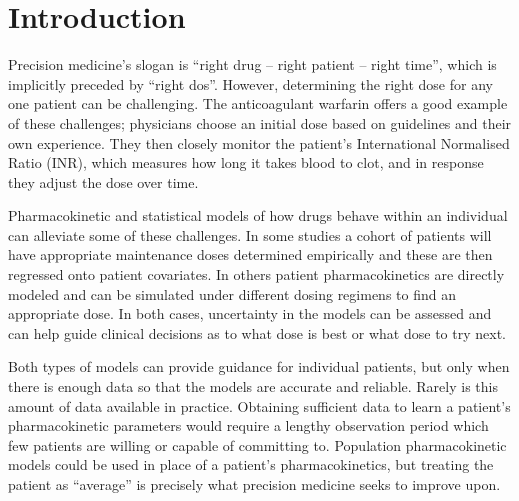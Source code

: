 \section{Introduction}

Precision medicine’s slogan is ``right drug -- right patient -- right time'', which is implicitly preceded by ``right dos''. However, determining the right dose for any one patient can be challenging. The anticoagulant warfarin offers a good example of these challenges; physicians choose an initial dose based on guidelines and their own experience. They then closely monitor the patient’s International Normalised Ratio (INR), which measures how long it takes blood to clot, and in response they adjust the dose over time.

Pharmacokinetic and statistical models of how drugs behave within an individual can alleviate some of these challenges.  In some studies \cite{Sohrabi2017-zv, Caldwell2007-mi, international2009estimation}  a cohort of patients will have appropriate maintenance doses determined empirically and these are then regressed onto patient covariates.  In others \cite{Zhu2017-rk, Xue2017-mp}  patient pharmacokinetics are directly modeled and can be simulated under different dosing regimens to find an appropriate dose.  In both cases, uncertainty in the models can be assessed and can help guide clinical decisions as to what dose is best or what dose to try next.

Both types of  models can provide guidance for individual patients, but only when there is enough data so that the models are accurate and reliable.  Rarely is this amount of data available in practice.  Obtaining sufficient data to learn a patient’s pharmacokinetic parameters would require a lengthy observation period which few patients are willing or capable of committing to. Population pharmacokinetic models could be used in place of a patient’s pharmacokinetics, but treating the patient as “average” is precisely what precision medicine seeks to improve upon.

